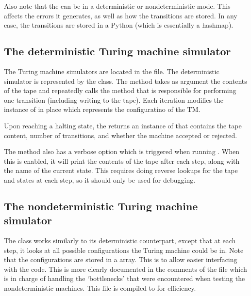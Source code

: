 Also note that the  can be in a deterministic or nondeterministic mode. This affects the errors it generates, as well as how the transitions are stored. In any case, the transitions are stored in a Python  (which is essentially a hashmap). 

\subsection{The deterministic Turing machine simulator}

The Turing machine simulators are located in the  file. 
The deterministic simulator is represented by the  class. 
The  method takes as argument the contents of the tape and repeatedly calls the  method that is responsible for performing one transition (including writing to the tape). Each iteration modifies the instance of  in place which represents the configuratino of the TM. 

Upon reaching a halting state, the  returns an instance of  that contains the tape content, number of transitions, and whether the machine accepted or rejected.

The  method also has a verbose option which is triggered when running . When this is enabled, it will print the contents of the tape after each step, along with the name of the current state. This requires doing reverse lookups for the tape and states at each step, so it should only be used for debugging.

\subsection{The nondeterministic Turing machine simulator}

The  class works similarly to its deterministic counterpart, except that at each step, it looks at all possible configurations the Turing machine could be in. Note that the configurations are stored in a  array. This is to allow easier interfacing with the  code. This is more clearly documented in the comments of the  file which is in charge of handling the `bottlenecks' that were encountered when testing the nondeterministic machines. This file is compiled to  for efficiency. 